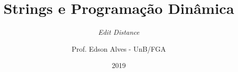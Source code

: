 \title{Strings e Programação Dinâmica}
\subtitle{{\it Edit Distance}}
\author{Prof. Edson Alves - UnB/FGA}
\date{2019}
